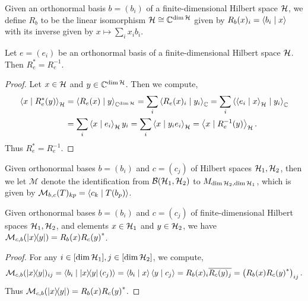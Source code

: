  Given an orthonormal basis $b=(b_i)$ of a finite-dimensional Hilbert space $\mathcal{H}$, we define $R_b$ to be the linear isomorphism $\mathcal{H}\cong\mathbb{C}^{\dim\mathcal{H}}$ given by $R_b(x)_i=\left\langle b_i \mid x\right\rangle$ with its inverse given by $x\mapsto\sum_ix_ib_i$.
 \begin{lemma}\label{repr_adjoint}\leanok
  Let $e=(e_i)$ be an orthonormal basis of a finite-dimensional Hilbert space $\mathcal{H}$. Then $R_e^*=R_e^{-1}$.
 \end{lemma}
 \begin{proof}\leanok
  Let $x\in\mathcal{H}$ and $y\in\mathbb{C}^{\dim\mathcal{H}}$. Then we compute,
  \begin{align*}
   \left\langle x \mid R_e^*(y)\right\rangle_{\mathcal{H}} &= \left\langle R_e(x) \mid y\right\rangle_{\mathbb{C}^{\dim\mathcal{H}}} = \sum_i\left\langle R_e(x)_i \mid y_i\right\rangle_{\mathbb{C}} = \sum_i\left\langle\left\langle e_i \mid x\right\rangle_{\mathcal{H}} \mid y_i\right\rangle_{\mathbb{C}}\\
   &= \sum_i\left\langle x \mid e_i\right\rangle_{\mathcal{H}}y_i = \sum_i\left\langle x \mid y_ie_i\right\rangle_{\mathcal{H}}=\left\langle x \mid R_e^{-1}(y)\right\rangle_{\mathcal{H}}.
  \end{align*}
  Thus $R_e^*=R_e^{-1}$.
 \end{proof}
 Given orthonormal bases $b=(b_i)$ and $c=(c_j)$ of Hilbert spaces $\mathcal{H}_1,\mathcal{H}_2$, then we let $\mathcal{M}$ denote the identification from $\mathcal{B}(\mathcal{H}_1,\mathcal{H}_2)$ to $M_{\dim\mathcal{H}_2,\dim\mathcal{H}_1}$, which is given by $\mathcal{M}_{b,c}(T)_{kp}=\left\langle c_k \mid T(b_p)\right\rangle$.
 \begin{lemma}\label{rankOne_toMatrix}\leanok
  Given orthonormal bases $b=(b_i)$ and $c=(c_j)$ of finite-dimensional Hilbert spaces $\mathcal{H}_1,\mathcal{H}_2$, and elements $x\in\mathcal{H}_1$ and $y\in\mathcal{H}_2$, we have $\mathcal{M}_{c,b}(\left\lvert x\right\rangle\!\!\left\langle y\right\rvert)=R_b(x){R_c(y)}^*$.
 \end{lemma}
 \begin{proof}\leanok
  For any $i\in[\dim\mathcal{H}_1],j\in[\dim\mathcal{H}_2]$, we compute,
  \[\mathcal{M}_{c,b}(\left\lvert x\right\rangle\!\!\left\langle y\right\rvert)_{ij}=\left\langle b_i \mid \left\lvert x\right\rangle\!\!\left\langle y\right\rvert(c_j)\right\rangle=\left\langle b_i \mid x\right\rangle\left\langle y \mid c_j\right\rangle=R_b(x)_i\overline{R_c(y)_j}=\left(R_b(x){R_c(y)}^*\right)_{ij}.\]
  Thus $\mathcal{M}_{c,b}(\left\lvert x\right\rangle\!\!\left\langle y\right\rvert)=R_b(x){R_c(y)}^*$.
 \end{proof}
